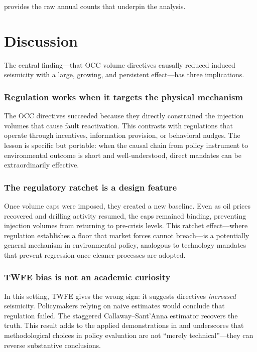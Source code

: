 \documentclass[12pt]{article}
\begin{document}
 provides the raw annual counts that underpin the analysis.



\section{Discussion}

The central finding---that OCC volume directives causally reduced induced seismicity with a large, growing, and persistent effect---has three implications.

\subsubsection*{Regulation works when it targets the physical mechanism} The OCC directives succeeded because they directly constrained the injection volumes that cause fault reactivation. This contrasts with regulations that operate through incentives, information provision, or behavioral nudges. The lesson is specific but portable: when the causal chain from policy instrument to environmental outcome is short and well-understood, direct mandates can be extraordinarily effective.

\subsubsection*{The regulatory ratchet is a design feature} Once volume caps were imposed, they created a new baseline. Even as oil prices recovered and drilling activity resumed, the caps remained binding, preventing injection volumes from returning to pre-crisis levels. This ratchet effect---where regulation establishes a floor that market forces cannot breach---is a potentially general mechanism in environmental policy, analogous to technology mandates that prevent regression once cleaner processes are adopted.

\subsubsection*{TWFE bias is not an academic curiosity} In this setting, TWFE gives the wrong sign: it suggests directives \textit{increased} seismicity. Policymakers relying on naive estimates would conclude that regulation failed. The staggered Callaway--Sant'Anna estimator recovers the truth. This result adds to the applied demonstrations in \citet{baker2022much} and underscores that methodological choices in policy evaluation are not ``merely technical''---they can reverse substantive conclusions.
\end{document}
